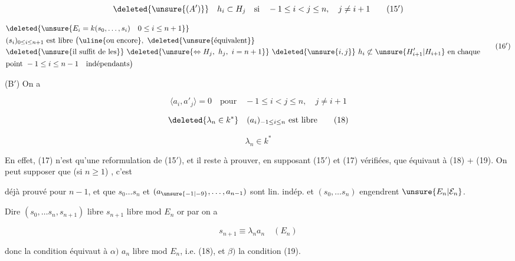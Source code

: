 \[\deleted{\unsure{(A')}}\quad h_i\subset H_j\quad\text{si}\quad -1\leq i<j\leq n,\quad j\ne i+1\tag*{(15$'$)}\]

\[\begin{aligned}&\deleted{\unsure{E_i=k(s_0,\ldots,s_{i})\quad 0\leq i\leq n+1}}\\ & (s_i)_{0\leq i\leq n+1}\text{ est libre }\bigl(\uline{\text{ou encore}},\ \deleted{\unsure{\text{équivalent}}}\\ &\deleted{\unsure{\text{il suffit de les}}}\ \deleted{\unsure{\Leftrightarrow H_j,\ h_j,\ i=n+1}}\ \deleted{\unsure{i,j}}\ h_i\not\subset \unsure{H'_{i+1}|H_{i+1}}\text{ en chaque}\\ &\text{point }-1\leq i\leq n-1\quad\text{indépendants}\bigr)\end{aligned}\tag*{(16$'$)}\]

(B$'$) On a

\[\langle a_i,a'_j\rangle=0\quad\text{pour}\quad-1\leq i<j\leq n,\quad j\ne i+1\tag*{(17)}\]

\[\deleted{\lambda_n\in k^*}\quad(a_i)_{-1\leq i\leq n}\text{ est libre}\tag*{(18)}\]

\[\lambda_n\in k^*\tag*{(19)}\]



En effet, (17) n'est qu'une reformulation de (15$'$), et il reste à prouver, en supposant (15$'$) et (17) vérifiées, que  équivaut à (18) + (19).  On peut supposer que  (si $n\geq1$) , c'est


déjà prouvé pour $n-1$, et que $s_0\ldots s_n$ et $(a_{\unsure{-1|-9}},\ldots,a_{n-1})$ sont lin. indép. et $(s_0,\ldots s_n)$ engendrent $\unsure{E_n|\mathcal E_n}$. 

Dire $(s_0,\ldots s_n,s_{n+1})$ libre  $s_{n+1}$ libre mod $E_n$   or par  on a

\[s_{n+1}\equiv\lambda_n a_n\quad(E_n)\]

donc la condition équivaut à $\alpha)$ $a_n$ libre mod $E_n$, i.e. (18), et $\beta)$  la condition (19). 

